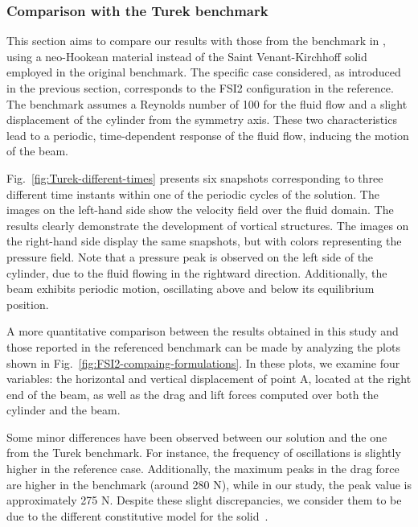 \documentclass[11pt,english]{article}
\begin{document}
\subsubsection{Comparison with the Turek benchmark}

This section aims to compare our results with those from the benchmark in \cite{turektest}, using a neo-Hookean material instead of the Saint Venant-Kirchhoff solid employed in the original benchmark. The specific case considered, as introduced in the previous section, corresponds to the FSI2 configuration in the reference. The benchmark assumes a Reynolds number of 100 for the fluid flow and a slight displacement of the cylinder from the symmetry axis. These two characteristics lead to a periodic, time-dependent response of the fluid flow, inducing the motion of the beam.

Fig.~\ref{fig:Turek-different-times} presents six snapshots corresponding to three different time instants within one of the periodic cycles of the solution. The images on the left-hand side show the velocity field over the fluid domain. The results clearly demonstrate the development of vortical structures. The images on the right-hand side display the same snapshots, but with colors representing the pressure field. Note that a pressure peak is observed on the left side of the cylinder, due to the fluid flowing in the rightward direction. Additionally, the beam exhibits periodic motion, oscillating above and below its equilibrium position.

A more quantitative comparison between the results obtained in this study and those reported in the referenced benchmark can be made by analyzing the plots shown in Fig.~\ref{fig:FSI2-compaing-formulations}. In these plots, we examine four variables: the horizontal and vertical displacement of point A, located at the right end of the beam, as well as the drag and lift forces computed over both the cylinder and the beam.

Some minor differences have been observed between our solution and the one from the Turek benchmark. For instance, the frequency of oscillations is slightly higher in the reference case. Additionally, the maximum peaks in the drag force are higher in the benchmark (around 280 N), while in our study, the peak value is approximately 275 N. Despite these slight discrepancies, we consider them to be due to the different constitutive model for the solid~\cite{MorenoCastanarFSIVisco}.

\end{document}
